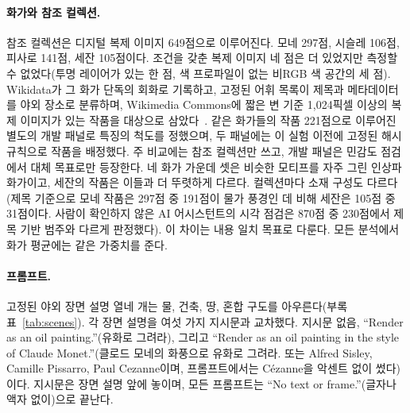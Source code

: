 \documentclass[10pt]{article}
\begin{document}
\paragraph{화가와 참조 컬렉션.}
참조 컬렉션은 디지털 복제 이미지 649점으로 이루어진다. 모네 297점, 시슬레 106점, 피사로 141점,
세잔 105점이다. 조건을 갖춘 복제 이미지 네 점은 더 있었지만 측정할 수 없었다(투명 레이어가 있는 한 점,
색 프로파일이 없는 비RGB 색 공간의 세 점). Wikidata가 그 화가 단독의 회화로 기록하고, 고정된 어휘
목록이 제목과 메타데이터를 야외 장소로 분류하며, Wikimedia Commons에 짧은 변 기준 1,024픽셀 이상의
복제 이미지가 있는 작품을 대상으로 삼았다~\citep{wikimediacommons,vrandecic2014wikidata}. 같은
화가들의 작품 221점으로 이루어진 별도의 개발 패널로 특징의 척도를 정했으며, 두 패널에는 이 실험 이전에
고정된 해시 규칙으로 작품을 배정했다. 주 비교에는 참조 컬렉션만 쓰고, 개발 패널은 민감도 점검에서 대체
목표로만 등장한다. 네 화가 가운데 셋은 비슷한 모티프를 자주 그린 인상파 화가이고, 세잔의 작품은 이들과
더 뚜렷하게 다르다. 컬렉션마다 소재 구성도 다르다(제목 기준으로 모네 작품은 297점 중 191점이 물가
풍경인 데 비해 세잔은 105점 중 31점이다. 사람이 확인하지 않은 AI 어시스턴트의 시각 점검은 870점 중
230점에서 제목 기반 범주와 다르게 판정했다). 이 차이는 내용 일치 목표로 다룬다. 모든 분석에서 화가
평균에는 같은 가중치를 준다.

\paragraph{프롬프트.}
고정된 야외 장면 설명 열네 개는 물, 건축, 땅, 혼합 구도를 아우른다(부록 표~\ref{tab:scenes}). 각
장면 설명을 여섯 가지 지시문과 교차했다. 지시문 없음, ``Render as an oil painting.''(유화로 그려라),
그리고 ``Render as an oil painting in the style of Claude Monet.''(클로드 모네의 화풍으로 유화로
그려라. 또는 Alfred Sisley, Camille Pissarro, Paul Cezanne이며, 프롬프트에서는 C\'ezanne을 악센트
없이 썼다)이다. 지시문은 장면 설명 앞에 놓이며, 모든 프롬프트는 ``No text or frame.''(글자나 액자
없이)으로 끝난다.
\end{document}
